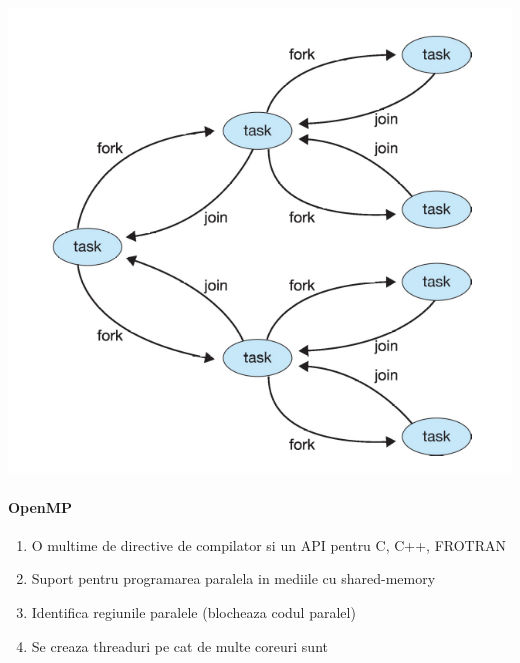 \documentclass{article}
\begin{document}
\begin{center}
    \includegraphics[scale=0.3]{10_forkjoin.png}
\end{center}

\paragraph*{OpenMP}
\begin{enumerate}
    \item O multime de directive de compilator si un API pentru C, C++, FROTRAN
    \item Suport pentru programarea paralela in mediile cu shared-memory
    \item Identifica regiunile paralele (blocheaza codul paralel)
    \item Se creaza threaduri pe cat de multe coreuri sunt
\end{enumerate}
\end{document}
